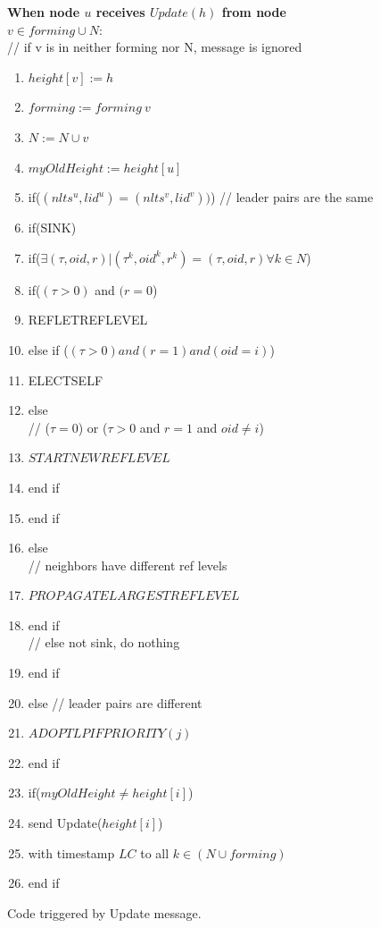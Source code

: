 \documentclass{article}
\begin{document}
\begin{figure}

\textbf{When node $u$ receives $Update(h)$ from node $v \in forming \cup N:$}
\\ \quad \quad // if v is in neither forming nor N, message is ignored
\begin{enumerate}

\item \quad$height[v] := h$
\item \quad$forming := forming \ {v}$
\item \quad$N := N ∪ {v}$
\item \quad$myOldHeight := height[u]$
\item \quad if($(nlts^u ,lid^u ) = (nlts^v ,lid^v ))$) // leader pairs are the same
\item \quad \quad if(SINK)
\item \quad \quad \quad if($\exists (\tau , oid, r) | (\tau ^k, oid^k, r^k) = (\tau , oid, r) \forall k \in N $)
\item \quad \quad \quad \quad if($(\tau > 0)$ and $(r = 0$)
\item \quad \quad \quad \quad \quad REFLETREFLEVEL
\item \quad \quad \quad \quad else if ($(\tau > 0) and (r = 1) and (oid = i)$)
\item \quad \quad \quad \quad \quad ELECTSELF
\item \quad \quad \quad \quad else
\\ // ($\tau = 0$) or ($\tau >0$ and $r=1$ and $oid \neq i$)
\item \quad \quad \quad \quad \quad $STARTNEWREFLEVEL$
\item \quad \quad \quad \quad  end if
\item \quad \quad \quad end if
\item \quad \quad else
\\ // neighbors have different ref levels
\item \quad \quad \quad $PROPAGATELARGESTREFLEVEL$
\item \quad \quad end if
\\ \qquad // else not sink, do nothing
\item \quad end if
\item else // leader pairs are different
\item \quad $ADOPTLPIFPRIORITY(j)$
\item  end if
\item if($myOldHeight \neq height[i]$)
\item \quad send Update($height[i]$)
\item \quad with timestamp $LC$ to all $k \in (N \cup forming)$
\item end if
\end{enumerate}
\caption{Code triggered by Update message.}
\end{figure}
\end{document}
